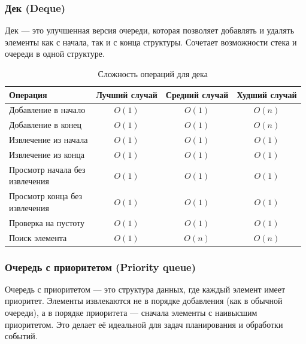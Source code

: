 \documentclass[a4paper,12pt]{article}
\begin{document}
\subsubsection{Дек (Deque)}
\label{subsubsec:дек-deque}

Дек --- это улучшенная версия очереди, которая позволяет добавлять и удалять элементы как с начала, так и с конца структуры. Сочетает возможности стека и очереди в одной структуре.

\begin{table}[H]
    \centering
    \begin{tabular}{|l|c|c|c|}
        \hline
        Операция & Лучший случай & Средний случай & Худший случай \\
        \hline
        Добавление в начало & $O(1)$ & $O(1)$ & $O(n)$ \\
        \hline
        Добавление в конец & $O(1)$ & $O(1)$ & $O(n)$ \\
        \hline
        Извлечение из начала & $O(1)$ & $O(1)$ & $O(1)$ \\
        \hline
        Извлечение из конца & $O(1)$ & $O(1)$ & $O(1)$ \\
        \hline
        \makecell[l]{Просмотр начала без \\извлечения} & $O(1)$ & $O(1)$ & $O(1)$ \\
        \hline
        \makecell[l]{Просмотр конца без \\извлечения} & $O(1)$ & $O(1)$ & $O(1)$ \\
        \hline
        Проверка на пустоту & $O(1)$ & $O(1)$ & $O(1)$ \\
        \hline
        Поиск элемента & $O(1)$ & $O(n)$ & $O(n)$ \\
        \hline
    \end{tabular}
    \caption{Сложность операций для дека}
\end{table}

\subsubsection{Очередь с приоритетом (Priority queue)}
\label{subsubsec:очередь-с-приоритетом-priority-queue}

Очередь с приоритетом --- это структура данных, где каждый элемент имеет приоритет. Элементы извлекаются не в порядке добавления (как в обычной очереди), а в порядке приоритета --- сначала элементы с наивысшим приоритетом. Это делает её идеальной для задач планирования и обработки событий.
\end{document}
